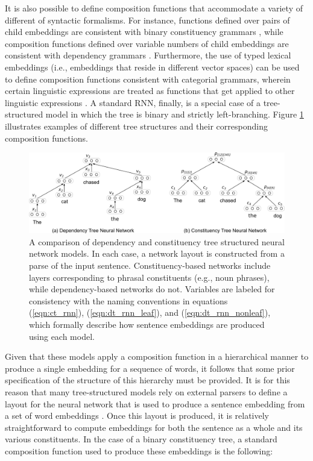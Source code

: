 It is also possible to define composition functions that accommodate a variety of different of syntactic formalisms. For instance, functions defined over pairs of child embeddings are consistent with binary constituency grammars \citep{Socher:2012}, while composition functions defined over variable numbers of child embeddings are consistent with dependency grammars \citep{Socher:2014,Tai:2015}. Furthermore, the use of typed lexical embeddings (i.e., embeddings that reside in different vector spaces) can be used to define composition functions consistent with categorial grammars, wherein certain linguistic expressions are treated as functions that get applied to other linguistic expressions \citep{Baroni:2014}. A standard RNN, finally, is a special case of a tree-structured model in which the tree is binary and strictly left-branching. Figure \ref{fig:tree-rnn} illustrates examples of different tree structures and their corresponding composition functions. 

\begin{figure}
\centering
	\includegraphics[width=6in]{figures/tree_comp.png}
	\caption{A comparison of dependency and constituency tree structured neural network models. In each case, a network layout is constructed from a parse of the input sentence. Constituency-based networks include layers corresponding to phrasal constituents (e.g., noun phrases), while dependency-based networks do not. Variables are labeled for consistency with the naming conventions in equations (\ref{eqn:ct_rnn}), (\ref{eqn:dt_rnn_leaf}), and (\ref{eqn:dt_rnn_nonleaf}), which formally describe how sentence embeddings are produced using each model.}
\label{fig:tree-rnn}
\end{figure}

Given that these models apply a composition function in a hierarchical manner to produce a single embedding for a sequence of words, it follows that some prior specification of the structure of this hierarchy must be provided. It is for this reason that many tree-structured models rely on external parsers to define a layout for the neural network that is used to produce a sentence embedding from a set of word embeddings \citep{Socher:2012,Socher:2014}. Once this layout is produced, it is relatively straightforward to compute embeddings for both the sentence as a whole and its various constituents. In the case of a binary constituency tree, a standard composition function used to produce these embeddings is the following:

